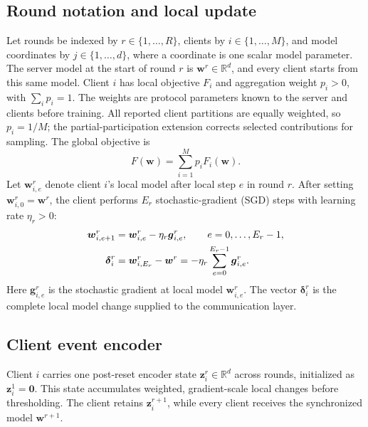 \documentclass[conference]{IEEEtran}
\newcommand{\vect}[1]{\boldsymbol{#1}}
\newcommand{\newrev}[1]{#1}
\newcommand{\spacerev}[1]{#1}
\begin{document}
\subsection{Round notation and local update}

Let rounds be indexed by $r\in\{1,\ldots,R\}$, clients by
$i\in\{1,\ldots,M\}$, and model coordinates by $j\in\{1,\ldots,d\}$, where a
coordinate is one scalar model parameter.
The server model at the start of round $r$ is
$\vect{w}^r\in\mathbb{R}^d$, and every client starts from this same model.
Client $i$ has local objective $F_i$ and aggregation weight $p_i>0$, with
$\sum_i p_i=1$. \newrev{The weights are protocol parameters known to the
server and clients before training. All reported client partitions are equally weighted, so $p_i=1/M$;
the partial-participation extension corrects selected contributions for
sampling.}
The global objective is
\begin{equation}
 F(\vect{w})=\sum_{i=1}^M p_iF_i(\vect{w}).
\end{equation}
Let $\vect{w}_{i,e}^r$ denote client $i$'s local model after local step $e$ in
round $r$. After setting $\vect{w}_{i,0}^r=\vect{w}^r$, the client performs
$E_r$ stochastic-gradient (SGD) steps with learning rate $\eta_r>0$:
\begin{align}
 \vect{w}_{i,e+1}^r&=\vect{w}_{i,e}^r-\eta_r\vect{g}_{i,e}^r,
 \qquad e=0,\ldots,E_r-1, \notag\\
 \vect{\delta}_i^r&=\vect{w}_{i,E_r}^r-\vect{w}^r
 =-\eta_r\sum_{e=0}^{E_r-1}\vect{g}_{i,e}^r .
 \label{eq:local-delta}
\end{align}
Here $\vect{g}_{i,e}^r$ is the stochastic gradient at local model
$\vect{w}_{i,e}^r$. The vector $\vect{\delta}_i^r$ is the complete local model
change supplied to the communication layer.

\subsection{Client event encoder}

\spacerev{Client $i$ carries one post-reset encoder state
$\vect{z}_i^r\in\mathbb{R}^d$ across rounds, initialized as
$\vect{z}_i^1=\vect{0}$. This state accumulates weighted, gradient-scale local
changes before thresholding. The client retains $\vect{z}_i^{r+1}$, while every
client receives the synchronized model $\vect{w}^{r+1}$.}
\end{document}
